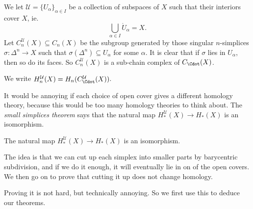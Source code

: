 \documentclass[a4paper]{article}
\theoremstyle{definition}
\begin{document}
\begin{defi}
  We let $\mathcal{U} = \{U_\alpha\}_{\alpha \in I}$ be a collection of subspaces of $X$ such that their interiors cover $X$, ie.
  \[
    \bigcup_{\alpha \in I} \mathring{U}_\alpha = X.
  \]
  Let $C_n^\mathcal{U}(X) \subseteq C_n(X)$ be the subgroup generated by those singular $n$-simplices $\sigma: \Delta^n \to X$ such that $\sigma(\Delta^n) \subseteq U_\alpha$ for some $\alpha$. It is clear that if $\sigma$ lies in $U_\alpha$, then so do its faces. So $C_n^{\mathcal{U}}(X)$ is a sub-chain complex of $C_\Cdot(X)$.

  We write $H_n^\mathcal{U}(X) = H_n(C_\Cdot^\mathcal{U}(X))$.
\end{defi}
It would be annoying if each choice of open cover gives a different homology theory, because this would be too many homology theories to think about. The \emph{small simplices theorem} says that the natural map $H_*^\mathcal{U}(X) \to H_*(X)$ is an isomorphism.

\begin{thm}
  The natural map $H_*^\mathcal{U}(X) \to H_*(X)$ is an isomorphism.
\end{thm}

The idea is that we can cut up each simplex into smaller parts by barycentric subdivision, and if we do it enough, it will eventually lie in on of the open covers. We then go on to prove that cutting it up does not change homology.

Proving it is not hard, but technically annoying. So we first use this to deduce our theorems.
\end{document}
